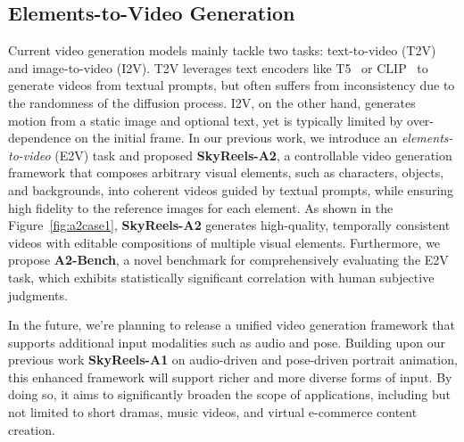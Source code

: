 \documentclass{article}
\begin{document}
\subsection{Elements-to-Video Generation}
Current video generation models mainly tackle two tasks: text-to-video (T2V) and image-to-video (I2V). T2V leverages text encoders like T5~\cite{raffel2019exploring} or CLIP~\cite{radford2021learning} to generate videos from textual prompts, but often suffers from inconsistency due to the randomness of the diffusion process. I2V, on the other hand, generates motion from a static image and optional text, yet is typically limited by over-dependence on the initial frame. In our previous work, we introduce an \emph{elements-to-video} (E2V) task and proposed \textbf{SkyReels-A2}\cite{fei2025skyreels}, a controllable video generation framework that composes arbitrary visual elements, such as characters, objects, and backgrounds, into coherent videos guided by textual prompts, while ensuring high fidelity to the reference images for each element. As shown in the Figure~\ref{fig:a2case1}, \textbf{SkyReels-A2} generates high-quality, temporally consistent videos with editable compositions of multiple visual elements.  Furthermore, we propose \textbf{A2-Bench}, a novel benchmark for comprehensively evaluating the E2V task, which exhibits statistically significant correlation with human subjective judgments.



In the future, we're planning to release a unified video generation framework that supports additional input modalities such as audio and pose. Building upon our previous work \textbf{SkyReels-A1}\cite{qiu2025skyreels} on audio-driven and pose-driven portrait animation, this enhanced framework will support richer and more diverse forms of input. By doing so, it aims to significantly broaden the scope of applications, including but not limited to short dramas, music videos, and virtual e-commerce content creation.
\end{document}
